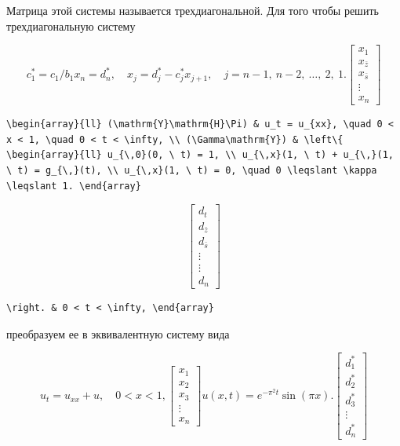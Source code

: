 \documentclass[
  ukrainian,
]{article}
\begin{document}
Матрица этой системы называется трехдиагональной. Для того чтобы решить
трехдиагональную систему

\[
c_1^* = c_1/b_1
x_n = d_n^*, \quad x_j = d_j^* - c_j^* x_{j+1}, \quad j = n-1, \ n-2, \ \dots, \ 2, \ 1.
\begin{bmatrix} x_1 \\ x_{\bar{z}} \\ x_{\bar{s}} \\ \vdots \\ x_n \end{bmatrix}
\]

\begin{verbatim}
\begin{array}{ll} (\mathrm{Y}\mathrm{H}\Pi) & u_t = u_{xx}, \quad 0 < x < 1, \quad 0 < t < \infty, \\ (\Gamma\mathrm{Y}) & \left\{ \begin{array}{ll} u_{\,0}(0, \ t) = 1, \\ u_{\,x}(1, \ t) + u_{\,}(1, \ t) = g_{\,}(t), \\ u_{\,x}(1, \ t) = 0, \quad 0 \leqslant \kappa \leqslant 1. \end{array}
\end{verbatim}

\[
\begin{bmatrix} d_t \\ d_{\bar{z}} \\ d_{\bar{s}} \\ \vdots \\ \vdots \\ d_n \end{bmatrix}
\]

\begin{verbatim}
\right. & 0 < t < \infty, \end{array}
\end{verbatim}

преобразуем ее в эквивалентную систему вида

\[
u_t = u_{xx} + u, \quad 0 < x < 1,
\begin{bmatrix} x_1 \\ x_2 \\ x_3 \\ \vdots \\ x_n \end{bmatrix}
u(x, t) = e^{-\pi^2 t} \sin(\pi x).
\begin{bmatrix} d_1^* \\ d_2^* \\ d_3^* \\ \vdots \\ d_n^* \end{bmatrix}
\]
\end{document}
